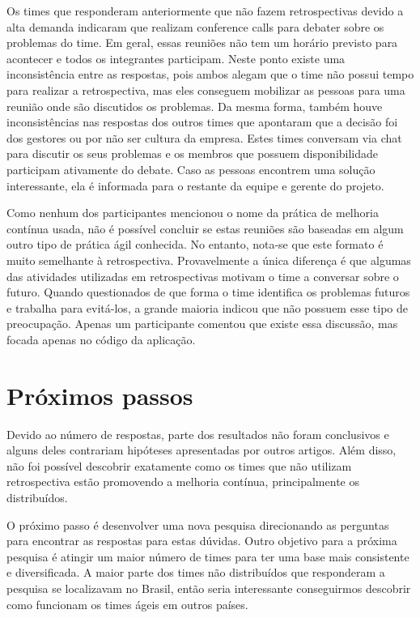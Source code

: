 \documentclass[12pt]{article}
\begin{document}
Os times que responderam anteriormente que não fazem retrospectivas devido a alta demanda indicaram que realizam conference calls para debater sobre os problemas do time. Em geral, essas reuniões não tem um horário previsto para acontecer e todos os integrantes participam. Neste ponto existe uma inconsistência entre as respostas, pois ambos alegam que o time não possui tempo para realizar a retrospectiva, mas eles conseguem mobilizar as pessoas para uma reunião onde são discutidos os problemas. Da mesma forma, também houve inconsistências nas respostas dos outros times que apontaram que a decisão foi dos gestores ou por não ser cultura da empresa. Estes times conversam via chat para discutir os seus problemas e os membros que possuem disponibilidade participam ativamente do debate. Caso as pessoas encontrem uma solução interessante, ela é informada para o restante da equipe e gerente do projeto.

Como nenhum dos participantes mencionou o nome da prática de melhoria contínua usada, não é possível concluir se estas reuniões são baseadas em algum outro tipo de prática ágil conhecida. No entanto, nota-se que este formato é muito semelhante à retrospectiva. Provavelmente a única diferença é que algumas das atividades utilizadas em retrospectivas motivam o time a conversar sobre o futuro. Quando questionados de que forma o time identifica os problemas futuros e trabalha para evitá-los, a grande maioria indicou que não possuem esse tipo de preocupação. Apenas um participante comentou que existe essa discussão, mas focada apenas no código da aplicação.

\section{Próximos passos}

Devido ao número de respostas, parte dos resultados não foram conclusivos e alguns deles contrariam hipóteses apresentadas por outros artigos. Além disso, não foi possível descobrir exatamente como os times que não utilizam retrospectiva estão promovendo a melhoria contínua, principalmente os distribuídos.

O próximo passo é desenvolver uma nova pesquisa direcionando as perguntas para encontrar as respostas para estas dúvidas. Outro objetivo para a próxima pesquisa é atingir um maior número de times para ter uma base mais consistente e diversificada. A maior parte dos times não distribuídos que responderam a pesquisa se localizavam no Brasil, então seria interessante conseguirmos descobrir como funcionam os times ágeis em outros países.
\end{document}
